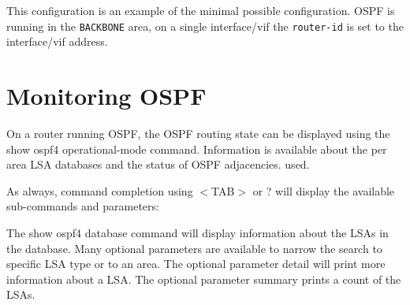 This configuration is an example of the minimal possible
configuration. OSPF is running in the {\tt BACKBONE} area, on a single
interface/vif the {\tt router-id} is set to the interface/vif address.

\newpage
\section{Monitoring OSPF}

On a router running OSPF, the OSPF routing state can be displayed using
the {\stt show ospf4} operational-mode command.  Information is available
about the per area LSA databases and the status of OSPF adjacencies.
used.

As always, command completion using $<$TAB$>$ or ? will display the
available sub-commands and parameters:

\vspace{0.1in}
\noindent{}

The {\stt show ospf4 database} command will display information about the
LSAs in the database. Many optional parameters are available to narrow
the search to specific LSA type or to an area. The optional parameter
{\stt detail} will print more information about a LSA. The optional
parameter {\stt summary} prints a count of the LSAs.

